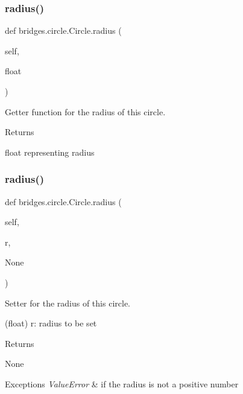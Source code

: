 \subsubsection{\texorpdfstring{radius()}{radius()}\hspace{0.1cm}{\footnotesize\ttfamily [1/2]}}
{\footnotesize\ttfamily def bridges.\+circle.\+Circle.\+radius (\begin{DoxyParamCaption}\item[{}]{self,  }\item[{}]{float }\end{DoxyParamCaption})}



Getter function for the radius of this circle. 

\begin{DoxyReturn}{Returns}


float representing radius 
\end{DoxyReturn}
\mbox{\label{classbridges_1_1circle_1_1_circle_ae7c2dc54c90d954626f99d7561009587}} 
\subsubsection{\texorpdfstring{radius()}{radius()}\hspace{0.1cm}{\footnotesize\ttfamily [2/2]}}
{\footnotesize\ttfamily def bridges.\+circle.\+Circle.\+radius (\begin{DoxyParamCaption}\item[{}]{self,  }\item[{}]{r,  }\item[{}]{None }\end{DoxyParamCaption})}



Setter for the radius of this circle. 

(float) r\+: radius to be set \begin{DoxyReturn}{Returns}


None
\end{DoxyReturn}

\begin{DoxyExceptions}{Exceptions}
{\em Value\+Error} & if the radius is not a positive number \\
\hline
\end{DoxyExceptions}
\mbox{\label{classbridges_1_1circle_1_1_circle_a85f41fd8adbaca617b96b5d656d8d6ff}} 
